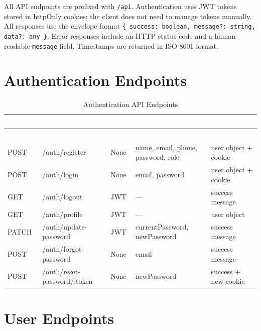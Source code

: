 \documentclass[12pt,a4paper]{report}
\newcommand{\thead}[1]{\cellcolor{tableheader}\textcolor{white}{\textbf{#1}}}
\begin{document}
All API endpoints are prefixed with \texttt{/api}. Authentication uses JWT tokens stored in httpOnly cookies; the client does not need to manage tokens manually. All responses use the envelope format \texttt{\{ success: boolean, message?: string, data?: any \}}. Error responses include an HTTP status code and a human-readable \texttt{message} field. Timestamps are returned in ISO 8601 format.

\section{Authentication Endpoints}

\begin{longtable}{|p{1cm}|p{2.5cm}|p{2cm}|p{4cm}|p{3cm}|}
\caption{Authentication API Endpoints}\label{tab:authapi}\\
\hline
\thead{Method} & \thead{Endpoint} & \thead{Auth} & \thead{Request Body} & \thead{Response} \\
\hline
\endfirsthead
\hline
\thead{Method} & \thead{Endpoint} & \thead{Auth} & \thead{Request Body} & \thead{Response} \\
\hline
\endhead
POST & /auth/register & None & name, email, phone, password, role & user object + cookie \\
\hline
POST & /auth/login & None & email, password & user object + cookie \\
\hline
GET & /auth/logout & JWT & — & success message \\
\hline
GET & /auth/profile & JWT & — & user object \\
\hline
PATCH & /auth/update-password & JWT & currentPassword, newPassword & success message \\
\hline
POST & /auth/forgot-password & None & email & success message \\
\hline
POST & /auth/reset-password/:token & None & newPassword & success + new cookie \\
\hline
\end{longtable}

\section{User Endpoints}
\end{document}
